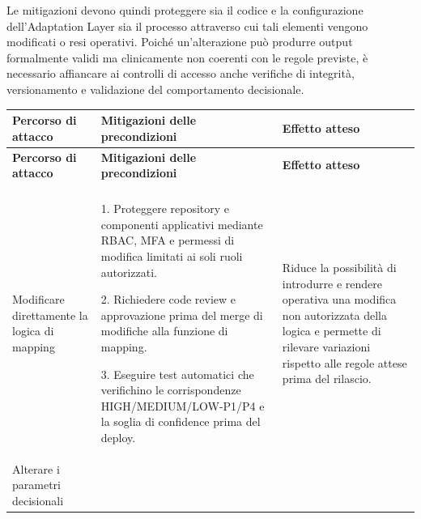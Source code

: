 Le mitigazioni devono quindi proteggere sia il codice e la configurazione dell'Adaptation Layer sia il processo attraverso cui tali elementi vengono modificati o resi operativi. Poiché un'alterazione può produrre output formalmente validi ma clinicamente non coerenti con le regole previste, è necessario affiancare ai controlli di accesso anche verifiche di integrità, versionamento e validazione del comportamento decisionale.

{
\small
{}
\setlength{\tabcolsep}{4pt}
\renewcommand{\arraystretch}{1.07}

\begin{xltabular}{\textwidth}{
    >{\raggedright\arraybackslash}p{3.1cm}
    X
    X
}

\toprule

\textbf{Percorso di attacco} &
\textbf{Mitigazioni delle precondizioni} &
\textbf{Effetto atteso} \\

\midrule

\endfirsthead

\toprule

\textbf{Percorso di attacco} &
\textbf{Mitigazioni delle precondizioni} &
\textbf{Effetto atteso} \\

\midrule

\endhead

 \\
\endfoot

\endlastfoot


Modificare direttamente la logica di mapping &

1. Proteggere repository e componenti applicativi mediante RBAC, MFA e
permessi di modifica limitati ai soli ruoli autorizzati.

2. Richiedere code review e approvazione prima del merge di modifiche alla
funzione di mapping.

3. Eseguire test automatici che verifichino le corrispondenze
HIGH/MEDIUM/LOW-P1/P4 e la soglia di confidence prima del deploy. &

Riduce la possibilità di introdurre e rendere operativa una modifica non
autorizzata della logica e permette di rilevare variazioni rispetto alle regole
attese prima del rilascio. \\

\midrule


Alterare i parametri decisionali &


\end{xltabular}}
